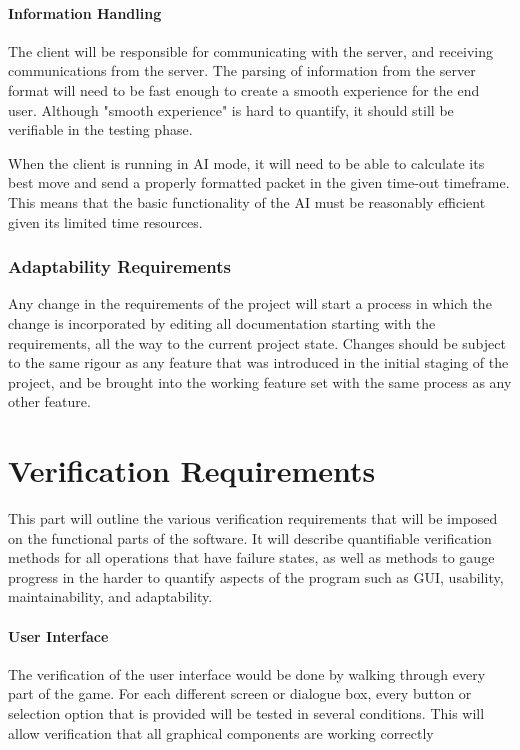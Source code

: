 \documentclass[12pt]{article}
\begin{document}
\subsection{Information Handling}
The client will be responsible for communicating with the server, and receiving
communications from the server.  The parsing of information from the server
format will need to be fast enough to create a smooth experience for the end
user.  Although "smooth experience" is hard to quantify, it should still
be verifiable in the testing phase.

When the client is running in AI mode, it will need to be able to calculate
its best move and send a properly formatted packet in the given time-out 
timeframe.  This means that the basic functionality of the AI must be reasonably
efficient given its limited time resources.

\section{Adaptability Requirements}
Any change in the requirements of the project will start a process in which
the change is incorporated by editing all documentation starting with the
requirements, all the way to the current project state.  Changes should be
subject to the same rigour as any feature that was introduced in the initial
staging of the project, and be brought into the working feature set with the
same process as any other feature.


\newpage
\part{Verification Requirements} 
This part will outline the various verification requirements that will be imposed on
the functional parts of the software.  It will describe quantifiable verification
methods for all operations that have failure states, as well as methods to
gauge progress in the harder to quantify aspects of the program such as GUI, usability,
maintainability, and adaptability.
\setcounter{section}{1}



\subsection{User Interface}
The verification of the user interface would be done by walking through every part
of the game. For each different screen or dialogue box, every button or selection
option that is provided will be tested in several conditions. This will allow verification
that all graphical components are working correctly
\end{document}
